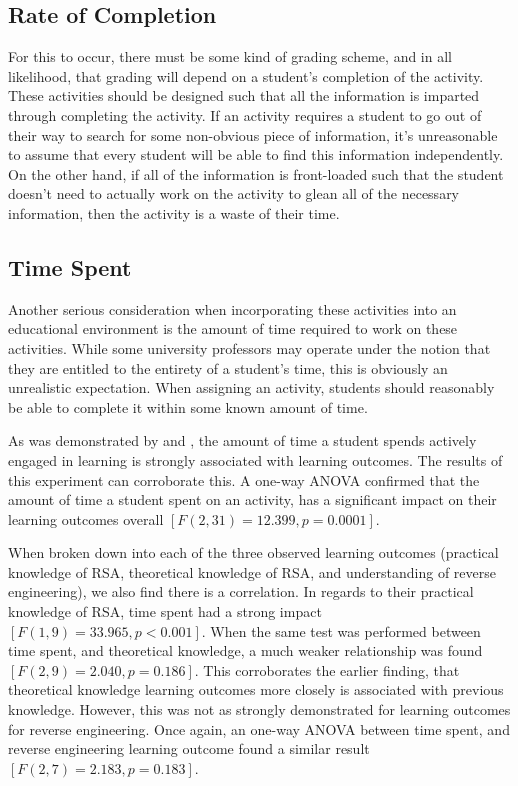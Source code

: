     \subsection{Rate of Completion}
         For this to occur, there must be some kind of grading scheme, and in all likelihood, that grading will depend on a student's completion of the activity. 
         These activities should be designed such that all the information is imparted through completing the activity. 
         If an activity requires a student to go out of their way to search for some non-obvious piece of information, it's unreasonable to assume that every student will be able to find this information independently. 
         On the other hand, if all of the information is front-loaded such that the student doesn't need to actually work on the activity to glean all of the necessary information, then the activity is a waste of their time. 


    \subsection{Time Spent}
        Another serious consideration when incorporating these activities into an educational environment is the amount of time required to work on these activities. 
        While some university professors may operate under the notion that they are entitled to the entirety of a student's time, this is obviously an unrealistic expectation. 
        When assigning an activity, students should reasonably be able to complete it within some known amount of time. 
        
        As was demonstrated by \citeauthor{C-Linehan} and \citeauthor{Z-Zeng}, the amount of time a student spends actively engaged in learning is strongly associated with learning outcomes. 
        The results of this experiment can corroborate this. 
        A one-way ANOVA confirmed that the amount of time a student spent on an activity, has a significant impact on their learning outcomes overall $[F(2,31)=12.399, p=0.0001]$.
        
        When broken down into each of the three observed learning outcomes (practical knowledge of RSA, theoretical knowledge of RSA, and understanding of reverse engineering), we also find there is a correlation. 
        In regards to their practical knowledge of RSA, time spent had a strong impact $[F(1,9)=33.965, p<0.001]$. 
        When the same test was performed between time spent, and theoretical knowledge, a much weaker relationship was found $[F(2, 9)=2.040, p=0.186]$. 
        This corroborates the earlier finding, that theoretical knowledge learning outcomes more closely is associated with previous knowledge. 
        However, this was not as strongly demonstrated for learning outcomes for reverse engineering. 
        Once again, an one-way ANOVA between time spent, and reverse engineering learning outcome found a similar result $[F(2, 7)=2.183, p=0.183]$. 

